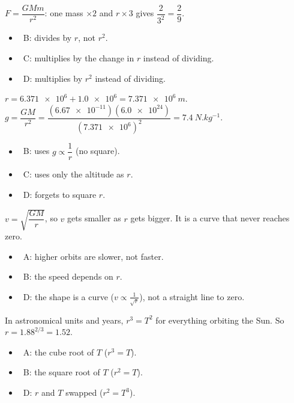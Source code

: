 \documentclass[12pt]{article}
\begin{document}
\begin{practiceanswers}
\begin{practiceans}
  $F = \dfrac{GMm}{r^2}$: one mass $\times 2$ and $r \times 3$ gives $\dfrac{2}{3^2} = \dfrac{2}{9}$.
  \begin{itemize}
    \item \xmark\ B: divides by $r$, not $r^2$.
    \item \xmark\ C: multiplies by the change in $r$ instead of dividing.
    \item \xmark\ D: multiplies by $r^2$ instead of dividing.
  \end{itemize}
\end{practiceans}

\begin{practiceans}
  $r = \num{6.371e6} + \num{1.0e6} = \qty{7.371e6}{m}$.
  $g = \dfrac{GM}{r^2} = \dfrac{(\num{6.67e-11})(\num{6.0e24})}{(\num{7.371e6})^2} = \qty{7.4}{N.kg^{-1}}$.
  \begin{itemize}
    \item \xmark\ B: uses $g \propto \dfrac{1}{r}$ (no square).
    \item \xmark\ C: uses only the altitude as $r$.
    \item \xmark\ D: forgets to square $r$.
  \end{itemize}
\end{practiceans}

\begin{practiceans}
  $v = \sqrt{\dfrac{GM}{r}}$, so $v$ gets smaller as $r$ gets bigger. It is a curve that never
  reaches zero.
  \begin{itemize}
    \item \xmark\ A: higher orbits are slower, not faster.
    \item \xmark\ B: the speed depends on $r$.
    \item \xmark\ D: the shape is a curve ($v \propto \frac{1}{\sqrt{r}}$), not a straight line to zero.
  \end{itemize}
\end{practiceans}

\begin{practiceans}
  In astronomical units and years, $r^3 = T^2$ for everything orbiting the Sun. So
  $r = 1.88^{2/3} = 1.52$.
  \begin{itemize}
    \item \xmark\ A: the cube root of $T$ ($r^3 = T$).
    \item \xmark\ B: the square root of $T$ ($r^2 = T$).
    \item \xmark\ D: $r$ and $T$ swapped ($r^2 = T^3$).
  \end{itemize}
\end{practiceans}


\end{practiceanswers}
\end{document}
